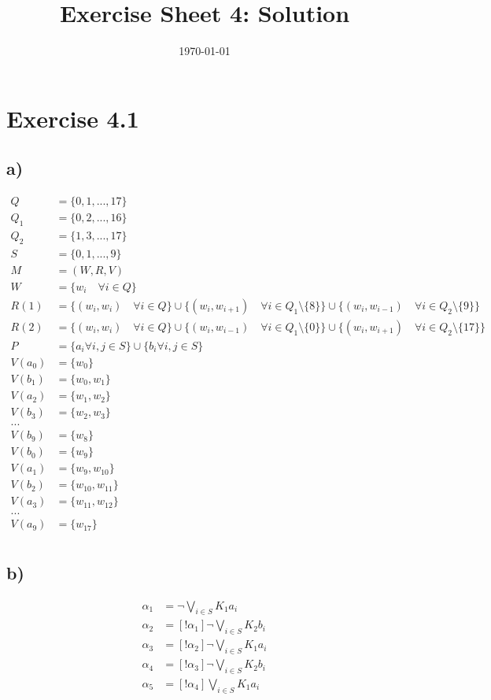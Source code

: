 \documentclass[a4paper]{article}
\begin{document}
\title{Exercise Sheet 4: Solution}
\author{}
\date{\today}

\section{Exercise 4.1}
\subsection{a)}
\begin{align*}
Q &= \{0, 1, ..., 17\}\\
Q_1 &= \{0, 2, ..., 16\}\\
Q_2 &= \{1, 3, ..., 17\}\\
S &= \{0, 1, ..., 9\}\\
M &= (W, R, V)\\
W &= \{w_i \quad\forall i \in Q\}\\
R(1) &= \{(w_i, w_i) \quad \forall i \in Q\} \cup
        \{(w_i, w_{i + 1}) \quad\forall i \in Q_1 \setminus \{8\}\} \cup
        \{(w_i, w_{i - 1}) \quad\forall i \in Q_2 \setminus \{9\}\}\\
R(2) &= \{(w_i, w_i) \quad \forall i \in Q\} \cup
        \{(w_i, w_{i - 1}) \quad\forall i \in Q_1 \setminus \{0\}\} \cup
        \{(w_i, w_{i + 1}) \quad\forall i \in Q_2 \setminus \{17\}\}\\
P &= \{a_i \forall i, j \in S\} \cup \{b_i \forall i, j \in S\}\\
V(a_0) &= \{w_0\}\\
V(b_1) &= \{w_0, w_1\}\\
V(a_2) &= \{w_1, w_2\}\\
V(b_3) &= \{w_2, w_3\}\\
...\\
V(b_9) &= \{w_8\}\\
V(b_0) &= \{w_9\}\\
V(a_1) &= \{w_9, w_{10}\}\\
V(b_2) &= \{w_{10}, w_{11}\}\\
V(a_3) &= \{w_{11}, w_{12}\}\\
...\\
V(a_9) &= \{w_{17}\}\\
\end{align*}

\subsection{b)}
\begin{align*}
\alpha_1 &= \lnot \bigvee_{i \in S} K_1 a_i\\
\alpha_2 &= [!\alpha_1]\lnot \bigvee_{i \in S} K_2 b_i\\
\alpha_3 &= [!\alpha_2]\lnot \bigvee_{i \in S} K_1 a_i\\
\alpha_4 &= [!\alpha_3]\lnot \bigvee_{i \in S} K_2 b_i\\
\alpha_5 &= [!\alpha_4] \bigvee_{i \in S} K_1 a_i\\
\end{align*}
\end{document}
